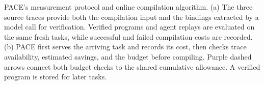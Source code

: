 \caption{PACE's measurement protocol and online compilation algorithm.
(a) The three source traces provide both the compilation input and the bindings extracted by a model call for verification.
Verified programs and agent replays are evaluated on the same fresh tasks, while successful and failed compilation costs are recorded.
(b) PACE first serves the arriving task and records its cost, then checks trace availability, estimated savings, and the budget before compiling.
Purple dashed arrows connect both budget checks to the shared cumulative allowance.
A verified program is stored for later tasks.}
